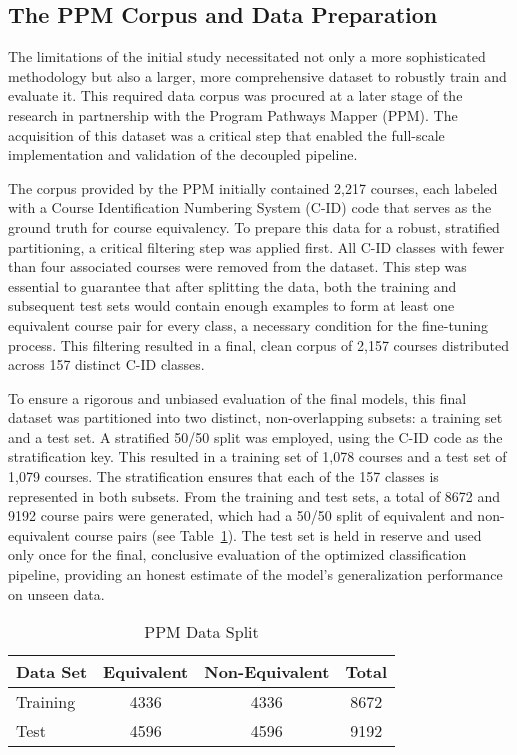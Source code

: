 \subsection{The PPM Corpus and Data Preparation}\label{ch:3.2.1}
The limitations of the initial study necessitated not only a more sophisticated methodology but also a larger, more comprehensive dataset to robustly train and evaluate it. This required data corpus was procured at a later stage of the research in partnership with the Program Pathways Mapper (PPM). The acquisition of this dataset was a critical step that enabled the full-scale implementation and validation of the decoupled pipeline.

The corpus provided by the PPM initially contained 2,217 courses, each labeled with a Course Identification Numbering System (C-ID) code that serves as the ground truth for course equivalency. To prepare this data for a robust, stratified partitioning, a critical filtering step was applied first. All C-ID classes with fewer than four associated courses were removed from the dataset. This step was essential to guarantee that after splitting the data, both the training and subsequent test sets would contain enough examples to form at least one equivalent course pair for every class, a necessary condition for the fine-tuning process. This filtering resulted in a final, clean corpus of 2,157 courses distributed across 157 distinct C-ID classes.

To ensure a rigorous and unbiased evaluation of the final models, this final dataset was partitioned into two distinct, non-overlapping subsets: a training set and a test set. A stratified 50/50 split was employed, using the C-ID code as the stratification key. This resulted in a training set of 1,078 courses and a test set of 1,079 courses. The stratification ensures that each of the 157 classes is represented in both subsets. From the training and test sets, a total of 8672 and 9192 course pairs were generated, which had a 50/50 split of equivalent and non-equivalent course pairs (see Table~\ref{tbl:ppmdatasplit}).  The test set is held in reserve and used only once for the final, conclusive evaluation of the optimized classification pipeline, providing an honest estimate of the model's generalization performance on unseen data.

\begin{table}[tb]
    \captionsetup{skip=5pt}
    \centering
    \caption{PPM Data Split}
    \begin{tabular}{lccc}
        \toprule
        \textbf{Data Set} & \textbf{Equivalent} & \textbf{Non-Equivalent} & \textbf{Total} \\
        \midrule
        Training     & 4336  & 4336    &  8672                                       \\
        Test         & 4596  & 4596    &  9192                                   \\
        \bottomrule
    \end{tabular}
    \label{tbl:ppmdatasplit}
\end{table}

